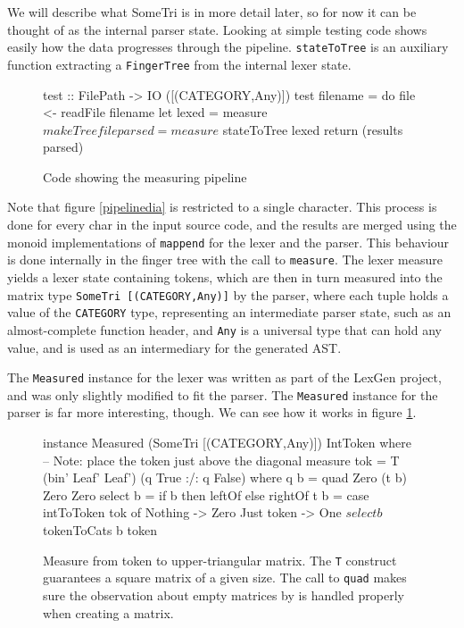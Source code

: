\documentclass[a4paper,12pt,twosided]{report}
\begin{document}
We will describe what SomeTri is in more detail later, so for now it can be
thought of as the internal parser state. Looking at simple testing
code shows easily how the data progresses through the pipeline.
\texttt{stateToTree} is an auxiliary function extracting a \texttt{FingerTree}
from the internal lexer state.

\begin{figure}[H]
\begin{code}
test :: FilePath -> IO ([(CATEGORY,Any)])
test filename = do
    file <- readFile filename
    let lexed  = measure $ makeTree file
        parsed = measure $ stateToTree lexed
    return (results parsed)
\end{code} 
\caption{Code showing the measuring pipeline}
\end{figure}

Note that figure \ref{pipelinedia} is restricted to a single character. This
process is done for every char in the input source code, and the results are
merged using the monoid implementations of \texttt{mappend} for the lexer and
the parser. This behaviour is done internally in the finger tree with the call
to \texttt{measure}.  The lexer measure yields a lexer state containing tokens,
which are then in turn measured into the matrix type \texttt{SomeTri
[(CATEGORY,Any)]} by the parser, where each tuple holds a value of the
\texttt{CATEGORY} type, representing an intermediate parser state, such as an
almost-complete function header, and \texttt{Any} is a universal type that can
hold any value, and is used as an intermediary for the generated AST. 

The \texttt{Measured} instance for the lexer was written as part of the LexGen
project, and was only slightly modified to fit the parser. The \texttt{Measured}
instance for the parser is far more interesting, though. We can see how it works
in figure \ref{parsemeasure}.

\begin{figure}[H]
\begin{code}
instance Measured (SomeTri [(CATEGORY,Any)]) IntToken where
    -- Note: place the token just above the diagonal
    measure tok = T (bin' Leaf' Leaf') (q True :/: q False)
      where q b = quad Zero (t b) Zero Zero
            select b = if b then leftOf else rightOf
            t b = case intToToken tok of
                Nothing    -> Zero
                Just token -> One $ select b $ tokenToCats b token

\end{code}
\caption{\label{parsemeasure} Measure from token to upper-triangular matrix. The
\texttt{T} construct guarantees a square matrix of a given size. The call to
\texttt{quad} makes sure the observation about empty matrices by
\citet{parparsepaper} is handled properly when creating a matrix.}
\end{figure}
\end{document}
